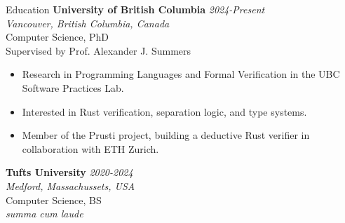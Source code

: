 \documentclass{resume} %
\begin{document}

\begin{rSection}{Education}
{\bf University of British Columbia} \hfill {\em 2024-Present}
\\ {\it Vancouver, British Columbia, Canada}
\\ Computer Science, PhD
\\ Supervised by Prof. Alexander J. Summers

\begin{itemize}
    \item Research in Programming Languages and Formal Verification in the UBC Software Practices Lab.
    \item Interested in Rust verification, separation logic, and type systems.
    \item Member of the Prusti project, building a deductive Rust verifier in collaboration with ETH Zurich.
\end{itemize}

{\bf Tufts University} \hfill {\em 2020-2024}
\\ {\it Medford, Massachussets, USA}
\\ Computer Science, BS
\\ \textit{summa cum laude}
\end{rSection}
\end{document}
